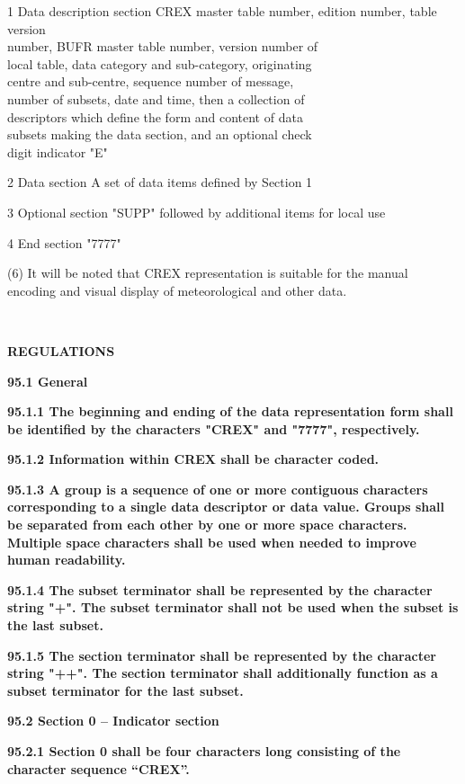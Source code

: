 1 Data description section CREX master table number, edition number, table version\\
number, BUFR master table number, version number of\\
local table, data category and sub-category, originating\\
centre and sub-centre, sequence number of message,\\
number of subsets, date and time, then a collection of\\
descriptors which define the form and content of data\\
subsets making the data section, and an optional check\\
digit indicator "E"

2 Data section A set of data items defined by Section 1

3 Optional section "SUPP" followed by additional items for local use

4 End section "7777"

(6) It will be noted that CREX representation is suitable for the manual encoding and visual display of meteorological and other data.

\textbf{\\
}

\textbf{REGULATIONS}

\textbf{95.1 General}

\textbf{95.1.1 The beginning and ending of the data representation form shall be identified by the characters "CREX" and "7777", respectively.}

\textbf{95.1.2 Information within CREX shall be character coded.}

\textbf{95.1.3 A group is a sequence of one or more contiguous characters corresponding to a single data descriptor or data value. Groups shall be separated from each other by one or more space characters. Multiple space characters shall be used when needed to improve human readability.}

\textbf{95.1.4 The subset terminator shall be represented by the character string "+". The subset terminator shall not be used when the subset is the last subset.}

\textbf{95.1.5 The section terminator shall be represented by the character string "++". The section terminator shall additionally function as a subset terminator for the last subset.}

\textbf{95.2 Section 0 -- Indicator section}

\textbf{95.2.1 Section 0 shall be four characters long consisting of the character sequence ``CREX''.}

